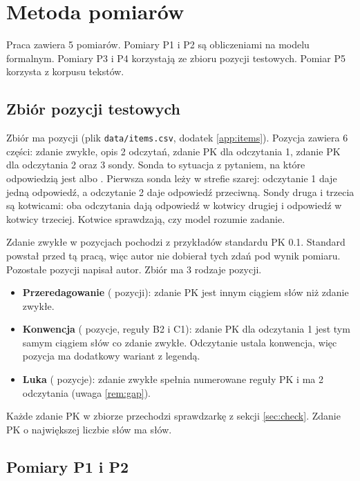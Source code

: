 \section{Metoda pomiarów}
\label{sec:method}

Praca zawiera 5 pomiarów. Pomiary P1 i P2 są obliczeniami na modelu formalnym. Pomiary P3
i P4 korzystają ze zbioru pozycji testowych. Pomiar P5 korzysta z korpusu tekstów.

\subsection{Zbiór pozycji testowych}
\label{sec:items}

Zbiór ma \pkItems{} pozycji (plik \texttt{data/items.csv}, dodatek \ref{app:items}).
Pozycja zawiera 6 części: zdanie zwykłe, opis 2 odczytań, zdanie PK dla odczytania 1,
zdanie PK dla odczytania 2 oraz 3 sondy. Sonda to sytuacja z pytaniem, na które
odpowiedzią jest  albo . Pierwsza sonda leży w strefie szarej: odczytanie
1 daje jedną odpowiedź, a odczytanie 2 daje odpowiedź przeciwną. Sondy druga i trzecia są
kotwicami: oba odczytania dają odpowiedź  w kotwicy drugiej i odpowiedź 
w kotwicy trzeciej. Kotwice sprawdzają, czy model rozumie zadanie.

Zdanie zwykłe w \pkItemsStd{} pozycjach pochodzi z przykładów standardu PK 0.1. Standard
powstał przed tą pracą, więc autor nie dobierał tych zdań pod wynik pomiaru. Pozostałe
\pkItemsAuthor{} pozycji napisał autor. Zbiór ma 3 rodzaje pozycji.
\begin{itemize}[leftmargin=1.6em]
  \item \textbf{Przeredagowanie} (\pkItemsRewrite{} pozycji): zdanie PK jest innym ciągiem
  słów niż zdanie zwykłe.
  \item \textbf{Konwencja} (\pkItemsConv{} pozycje, reguły B2 i C1): zdanie PK dla odczytania
  1 jest tym samym ciągiem słów co zdanie zwykłe. Odczytanie ustala konwencja, więc
  pozycja ma dodatkowy wariant z legendą.
  \item \textbf{Luka} (\pkItemsGap{} pozycje): zdanie zwykłe spełnia numerowane reguły PK
  i ma 2 odczytania (uwaga \ref{rem:gap}).
\end{itemize}
Każde zdanie PK w zbiorze przechodzi sprawdzarkę z sekcji \ref{sec:check}. Zdanie PK
o największej liczbie słów ma \pkLintPkLongest{} słów.

\subsection{Pomiary P1 i P2}


